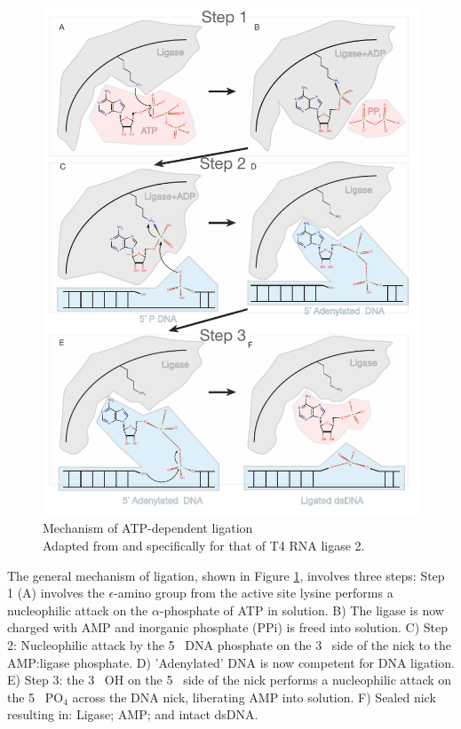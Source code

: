 \begin{figure}[htbp]
	\centering 
	\includegraphics{Figures/Chapter1/LigationMechanism.pdf}
	\caption[Mechanism of Rnl2 ATP-dependent ligation]
	{
		Mechanism of ATP-dependent ligation\\[0.25cm]
		Adapted from \citep{Nandakumar2006} and specifically for that of T4 RNA ligase 2.
	}
	\label{fig:Ligation Mechanism}
\end{figure}

The general mechanism of ligation, shown in Figure \ref{fig:Ligation Mechanism}, involves three steps: Step 1 (A) involves the $\epsilon$-amino group from the active site lysine performs a nucleophilic attack on the $\alpha$-phosphate of ATP in solution.  B) The ligase is now charged with AMP and inorganic phosphate (PPi) is freed into solution. C) Step 2: Nucleophilic attack by the 5\textprime~ DNA phosphate on the 3\textprime~ side of the nick to the AMP:ligase phosphate. D) 'Adenylated' DNA is now competent for DNA ligation. E) Step 3: the 3\textprime~ OH on the 5\textprime~ side of the nick performs a nucleophilic attack on the 5\textprime~ PO$_{4}$ across the DNA nick, liberating AMP into solution. F) Sealed nick resulting in: Ligase; AMP; and intact dsDNA.

